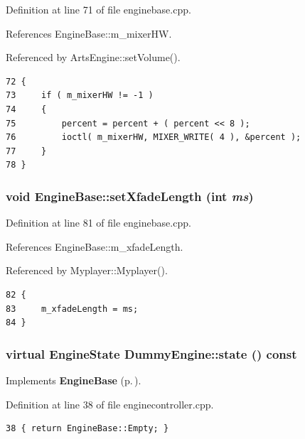 Definition at line 71 of file enginebase.cpp.

References Engine\-Base::m\_\-mixer\-HW.

Referenced by Arts\-Engine::set\-Volume().



\footnotesize\begin{verbatim}72 {
73     if ( m_mixerHW != -1 )
74     {
75         percent = percent + ( percent << 8 );
76         ioctl( m_mixerHW, MIXER_WRITE( 4 ), &percent );
77     }
78 }
\end{verbatim}\normalsize 
{}
\subsubsection{\setlength{\rightskip}{0pt plus 5cm}void Engine\-Base::set\-Xfade\-Length (int {\em ms})\hspace{0.3cm}{\tt  [virtual, inherited]}}\label{classEngineBase_EngineBasea24}




Definition at line 81 of file enginebase.cpp.

References Engine\-Base::m\_\-xfade\-Length.

Referenced by Myplayer::Myplayer().



\footnotesize\begin{verbatim}82 {
83     m_xfadeLength = ms;
84 }
\end{verbatim}\normalsize 
{}
\subsubsection{\setlength{\rightskip}{0pt plus 5cm}virtual {\bf Engine\-State} Dummy\-Engine::state () const\hspace{0.3cm}{\tt  [inline, private, virtual]}}\label{classDummyEngine_DummyEngined5}




Implements {\bf Engine\-Base} {\rm (p.\,\pageref{classEngineBase_EngineBasea8})}.

Definition at line 38 of file enginecontroller.cpp.



\footnotesize\begin{verbatim}38 { return EngineBase::Empty; }
\end{verbatim}\normalsize 
{}
